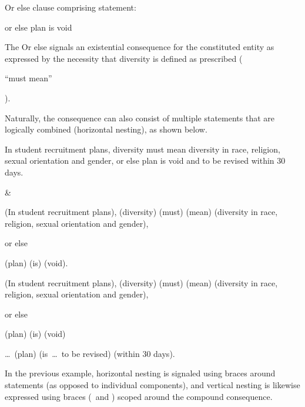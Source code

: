 \begin{landscape}
\begin{longtable}{\tabledims}
\sp

Or else clause comprising statement: \begin{exi}or else plan is void\end{exi}

\sp

The Or else signals an existential consequence for the constituted entity as expressed by the necessity that diversity is defined as prescribed (\begin{emp}``must mean''\end{emp}).

\sp

Naturally, the consequence can also consist of multiple statements that are logically combined (horizontal nesting), as shown below.

\sp



\begin{exi}
In student recruitment plans, diversity must mean diversity in race, religion, sexual orientation and gender, or else plan is void and to be revised within 30 days.\end{exi}


&

\vspace{0.05cm}

\begin{exi}
\Cacconst{}(In student recruitment plans), \E{}(diversity) \M{}(must) \F{}(mean) \Pp{}(diversity in race, religion, sexual orientation and gender), 

or else

\Oeconst{}\lb \E{}(plan) \F{}(is) \Pp{}(void)\rb .\end{exi}

\vspace{6.5cm}

\begin{exi}
\Cacconst{}(In student recruitment plans), \E{}(diversity) \M{}(must)  \F{}(mean) \Pp{}(diversity in race, religion, sexual orientation and gender), 

or else 

\Oeconst{}\lb \lb \E{}(plan) \F{}(is) \Pp{}(void)\rb

\ANDconst

\lb \dots~\E{}(plan) \F{}(is~\dots~to be revised) \Cexconst(within 30 days)\rb \rb .\end{exi}

\sp

In the previous example, horizontal nesting is signaled using braces around statements (as opposed to individual components), and vertical nesting is likewise expressed using braces (\lb~and \rb ) scoped around the compound consequence. 


\end{longtable}
\end{landscape}

